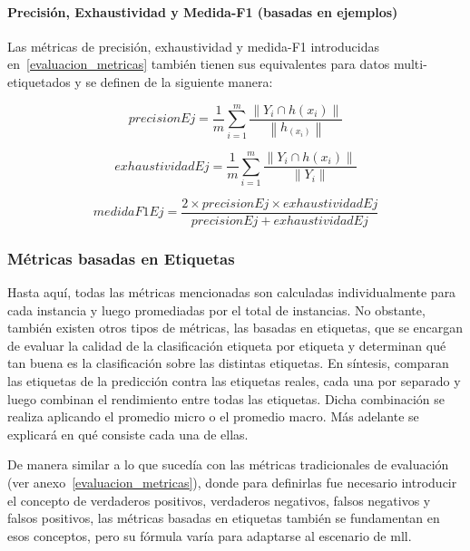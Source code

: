 \paragraph{Precisión, Exhaustividad y Medida-F1 (basadas en ejemplos)}

Las métricas de precisión, exhaustividad y medida-F1 introducidas
en~\ref{evaluacion_metricas} también tienen sus equivalentes para datos
multi-etiquetados y se definen de la siguiente manera:

\begin{equation}
	precisionEj = \frac{1}{m} \sum_{i=1}^{m}
	\frac{\left\|Y_{i} \cap h(x_{i})\right\|}
	{\left\|h_(x_{i})\right\|}
\end{equation}

\begin{equation}
	exhaustividadEj = \frac{1}{m} \sum_{i=1}^{m}
	\frac{\left\|Y_{i} \cap h(x_{i})\right\|}
	{\left\|Y_{i}\right\|}
\end{equation}

\begin{equation}
	medidaF1Ej = \frac{2 \times precisionEj \times exhaustividadEj}
	{precisionEj + exhaustividadEj }
\end{equation}


\subsubsection{Métricas basadas en Etiquetas}

Hasta aquí, todas las métricas mencionadas son calculadas individualmente para
cada instancia y luego promediadas por el total de instancias. No obstante,
también existen otros tipos de métricas, las basadas en etiquetas, que se
encargan de evaluar la calidad de la clasificación etiqueta por etiqueta y
determinan qué tan buena es la clasificación sobre las distintas etiquetas.  En
síntesis, comparan las etiquetas de la predicción contra las etiquetas reales,
cada una por separado y luego combinan el rendimiento entre todas las etiquetas.
Dicha combinación se realiza aplicando el promedio micro o el promedio macro.
Más adelante se explicará en qué consiste cada una de ellas.

De manera similar a lo que sucedía con las métricas tradicionales de evaluación
(ver anexo~\ref{evaluacion_metricas}), donde para definirlas fue necesario
introducir el concepto de verdaderos positivos, verdaderos negativos, falsos
negativos y falsos positivos, las métricas basadas en etiquetas también se
fundamentan en esos conceptos, pero su fórmula varía para adaptarse al escenario
de \acrshort{mll}.


